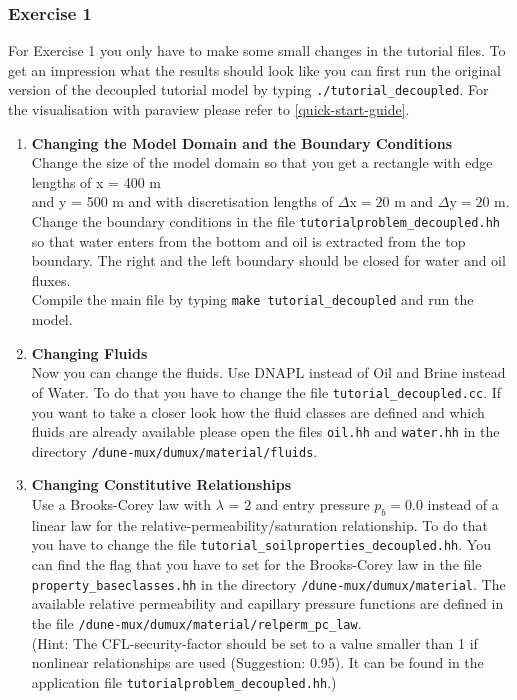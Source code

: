 \subsubsection{Exercise 1}
\renewcommand{\labelenumi}{\alph{enumi})}
For Exercise 1 you only have to make some small changes in the tutorial files.
To get an impression what the results should look like you can first run the original version of the decoupled tutorial model by typing  \texttt{./tutorial\_decoupled}. For the visualisation with paraview please refer to \ref{quick-start-guide}.
\begin{enumerate}
\item \textbf{Changing the Model Domain and the Boundary Conditions} \\
Change the size of the model domain so that you get a rectangle
with edge lengths of x = 400 m \\  and y = 500 m and with discretisation lengths of  $\Delta \text{x} = 20$ m and $\Delta \text{y} = 20$ m. \\
Change the boundary conditions in the file \texttt{tutorialproblem\_decoupled.hh} so that water enters from the bottom and oil is extracted from the top boundary. The right and the left boundary should be closed for water and oil fluxes.  \\
Compile the main file by typing \texttt{make tutorial\_decoupled} and run the model.

\item \textbf{Changing Fluids} \\
Now you can change the fluids. Use DNAPL instead of Oil and Brine instead of Water. To do that you have to change the file \texttt{tutorial\_decoupled.cc}. If you want to take a closer look how the fluid classes are defined and which fluids are already available please open the files \texttt{oil.hh} and \texttt{water.hh} in the directory
\texttt{/dune-mux/dumux/material/fluids}.

\item \textbf{Changing Constitutive Relationships} \\
Use a Brooks-Corey law with $\lambda$ = 2 and entry pressure $p_b = 0.0$ instead of a linear law for the relative-permeability/saturation relationship. To do that you have to change the file \texttt{tutorial\_soilproperties\_decoupled.hh}. You can find the flag that you have to set for the Brooks-Corey law in the file \texttt{property\_baseclasses.hh} in the directory \texttt{/dune-mux/dumux/material}.  
The available relative permeability and capillary pressure functions are defined in the file \texttt{/dune-mux/dumux/material/relperm\_pc\_law}.\\
(Hint: The CFL-security-factor should be set to a value smaller than 1 if nonlinear relationships are used (Suggestion: 0.95). It can be found in the application file \texttt{tutorialproblem\_decoupled.hh}.)
 

\end{enumerate}
